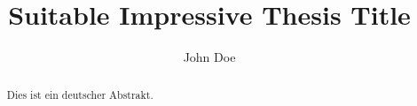 \documentclass[a4paper,twoside]{ociamthesis}
\title{Suitable Impressive Thesis Title}
\author{John Doe}
\begin{document}
\setlength{\textbaselineskip}{18pt plus1pt minus1pt}

\setlength{\frontmatterbaselineskip}{17pt plus1pt minus1pt}

\setlength{\baselineskip}{\textbaselineskip}


\setcounter{secnumdepth}{2}
\setcounter{tocdepth}{2}


\maketitle


\begin{acknowledgements}
 	\lipsum[1]
\end{acknowledgements}

\newpage \ \newpage

\renewcommand{\abstractname}{Kurzfassung}
\begin{abstract}
	Dies ist ein deutscher Abstrakt.
\end{abstract}
\newpage \ \newpage
\renewcommand{\abstractname}{Abstract}
\begin{abstract}
    \lipsum[2]
\end{abstract}
\newpage \ \newpage
\end{document}

